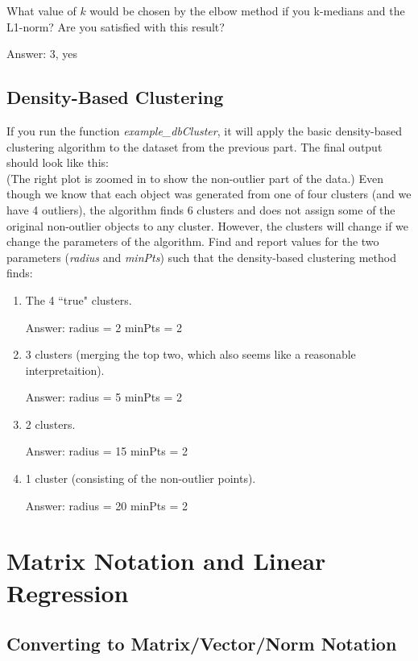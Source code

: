 \documentclass{article}
\def\ans#1{\par\gre{Answer: #1}}
\def\blu#1{{\color{blu}#1}}
\def\gre#1{{\color{gre}#1}}
\newcommand{\fig}[2]{\texttt{[image: a3f/\#2]}}
\def\enum#1{\begin{enumerate}#1\end{enumerate}}
\begin{document}
{{ \item What value of $k$ would be chosen by the elbow method if you k-medians and the L1-norm? Are you satisfied with this result?
\ans{3, yes}
 }}



\subsection{Density-Based Clustering}

If you run the function \emph{example\_dbCluster}, it will apply the basic density-based clustering algorithm to the dataset from the previous part. The final output should look like this:\\
(The right plot is zoomed in to show the non-outlier part of the data.)
Even though we know that each object was generated from one of four clusters (and we have 4 outliers), the algorithm finds 6 clusters and does not assign some of the original non-outlier objects to any cluster. However, the clusters will change if we change the parameters of the algorithm. Find and report values for the two parameters (\emph{radius} and \emph{minPts}) such that the density-based clustering method finds:
\blu{\enum{
\item The 4 ``true" clusters. \ans{radius = 2
minPts = 2}
\item 3 clusters (merging the top two, which also seems like a reasonable interpretaition). \ans{radius = 5
minPts = 2}
\item 2 clusters. \ans{radius = 15
minPts = 2}
\item 1 cluster (consisting of the non-outlier points).\ans{radius = 20
minPts = 2}
}}





\section{Matrix Notation and Linear Regression}

\subsection{Converting to Matrix/Vector/Norm Notation}
\end{document}
